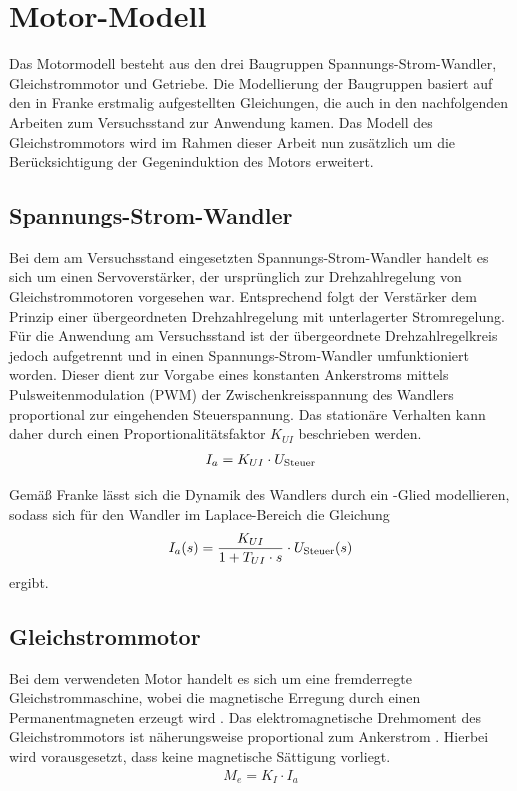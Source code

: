 \section{Motor-Modell}\label{sec:mot}

Das Motormodell besteht aus den drei Baugruppen Spannungs-Strom-Wandler, Gleichstrommotor und Getriebe. Die Modellierung der Baugruppen basiert auf den in Franke \cite{franke} erstmalig aufgestellten Gleichungen, die auch in den nachfolgenden Arbeiten zum Versuchsstand zur Anwendung kamen. Das Modell des Gleichstrommotors wird im Rahmen dieser Arbeit nun zusätzlich um die Berücksichtigung der Gegeninduktion des Motors erweitert.

\subsection{Spannungs-Strom-Wandler}

Bei dem am Versuchsstand eingesetzten Spannungs-Strom-Wandler handelt es sich um einen Servoverstärker, der ursprünglich zur Drehzahlregelung von Gleichstrommotoren vorgesehen war. Entsprechend folgt der Verstärker dem Prinzip einer übergeordneten Drehzahlregelung mit unterlagerter Stromregelung. Für die Anwendung am Versuchsstand ist der übergeordnete Drehzahlregelkreis jedoch aufgetrennt und in einen Spannungs-Strom-Wandler umfunktioniert worden. Dieser dient zur Vorgabe eines konstanten Ankerstroms mittels Pulsweitenmodulation (PWM) der Zwischenkreisspannung des Wandlers proportional zur eingehenden Steuerspannung. Das stationäre Verhalten kann daher durch einen Proportionalitätsfaktor $K_{UI}$ beschrieben werden.
\begin{align}
	I_a = K_{UI} \cdot U_{\mathrm{Steuer}}
\end{align}

Gemäß Franke \cite{franke} lässt sich die Dynamik des Wandlers durch ein -Glied modellieren, sodass sich für den Wandler im Laplace-Bereich die Gleichung
\begin{align} \label{eq:UI}
	I_a(s) = \frac{K_{UI}}{1+T_{UI} \cdot s} \cdot U_{\mathrm{Steuer}}(s)
\end{align}
ergibt.


\subsection{Gleichstrommotor}\label{subsec:dcMotor}

Bei dem verwendeten Motor handelt es sich um eine fremderregte Gleichstrommaschine, wobei die magnetische Erregung durch einen Permanentmagneten erzeugt wird \cite{franke}. Das elektromagnetische Drehmoment des Gleichstrommotors ist näherungsweise proportional zum Ankerstrom \cite{binder}. Hierbei wird vorausgesetzt, dass keine magnetische Sättigung vorliegt.
\begin{align}
	M_e = K_I \cdot I_a
\end{align}

